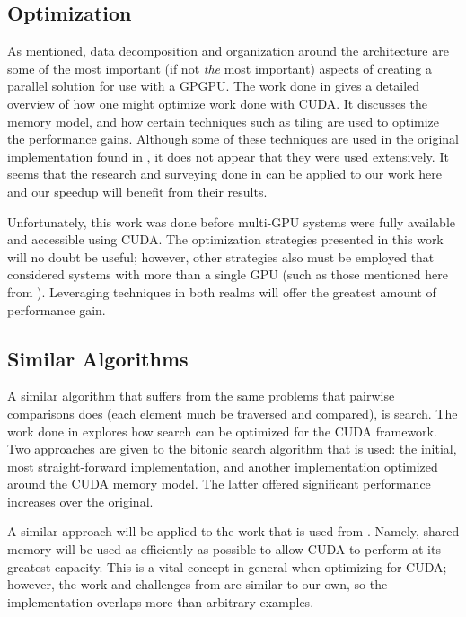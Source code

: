 \documentclass[smallextended]{svjour3}       %
\begin{document}
\subsection{Optimization}
\label{subsec:opti}
As mentioned, data decomposition and organization around the architecture are
some of the most important (if not \emph{the} most important) aspects of
creating a parallel solution for use with a GPGPU. The work done in
\cite{ryoo2008optimization} gives a detailed overview of how one might optimize
work done with CUDA. It discusses the memory model, and how certain techniques
such as tiling are used to optimize the performance gains. Although some of
these techniques are used in the original implementation found in
\cite{scharfglass2012breaking}, it does not appear that they were used
extensively. It seems that the research and surveying done in
\cite{ryoo2008optimization} can be applied to our work here and our speedup
will benefit from their results.

Unfortunately, this work was done before multi-GPU systems were fully available
and accessible using CUDA. The optimization strategies presented in this work
will no doubt be useful; however, other strategies also must be employed that
considered systems with more than a single GPU (such as those mentioned here
from \cite{thibault2009cuda}). Leveraging techniques in both realms will offer
the greatest amount of performance gain.

\subsection{Similar Algorithms}
\label{subsec:simialg}
A similar algorithm that suffers from the same problems that pairwise
comparisons does (each element much be traversed and compared), is search. The
work done in \cite{peters2011fast} explores how search can be optimized for the
CUDA framework. Two approaches are given to the bitonic search algorithm that
is used: the initial, most straight-forward implementation, and another
implementation optimized around the CUDA memory model. The latter offered
significant performance increases over the original. 

A similar approach will be applied to the work that is used from
\cite{scharfglass2012breaking}. Namely, shared memory will be used as efficiently
as possible to allow CUDA to perform at its greatest capacity. This is a vital
concept in general when optimizing for CUDA; however, the work and challenges
from \cite{peters2011fast} are similar to our own, so the implementation
overlaps more than arbitrary examples.
\end{document}
